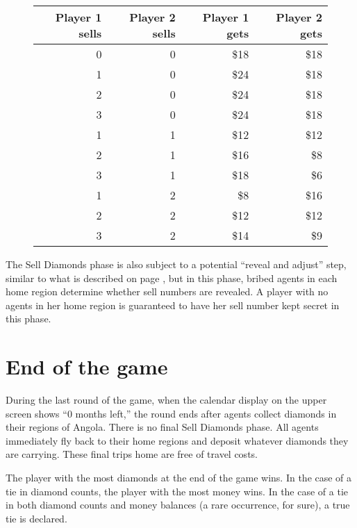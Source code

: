 \documentclass[8pt]{extbook}
\begin{document}
\begin{figure}[t]
\begin{center}
\begin{tabular}{r|r||r|r}
Player 1 sells & Player 2 sells & Player 1 gets & Player 2 gets\\
\hline
\hline
0 & 0 & \$18 & \$18 \\
\hline
1 & 0 & \$24 & \$18 \\
2 & 0 & \$24 & \$18 \\
3 & 0 & \$24 & \$18 \\
\hline
1 & 1 & \$12 & \$12 \\
2 & 1 & \$16 & \$8 \\
3 & 1 & \$18 & \$6 \\
\hline
1 & 2 & \$8 & \$16 \\
2 & 2 & \$12 & \$12 \\
3 & 2 & \$14 & \$9 \\
\end{tabular} 
\end{center}
\label{fig:sellTable}

\end{figure}

The Sell Diamonds phase is also subject to a potential ``reveal and adjust'' step, similar to what is described on page \pageref{sec:movesRevealed}, but in this phase, bribed agents in each home region determine whether sell numbers are revealed.  A player with no agents in her home region is guaranteed to have her sell number kept secret in this phase.


\section{End of the game}

During the last round of the game, when the calendar display on the upper screen shows ``0 months left,'' the round ends after agents collect diamonds in their regions of Angola.  There is no final Sell Diamonds phase.  All agents immediately fly back to their home regions and deposit whatever diamonds they are carrying.  These final trips home are free of travel costs.

The player with the most diamonds at the end of the game wins.  In the case of a tie in diamond counts, the player with the most money wins.  In the case of a tie in both diamond counts and money balances (a rare occurrence, for sure), a true tie is declared.
\end{document}
